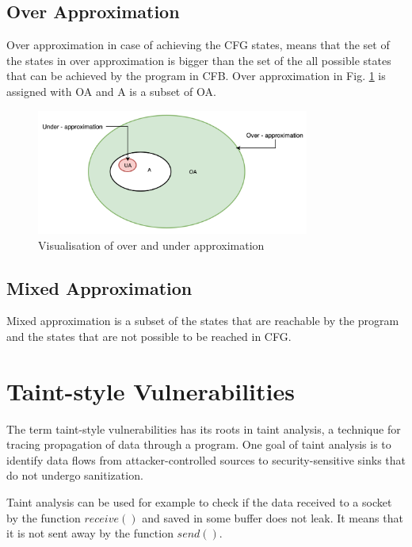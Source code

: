 \documentclass[a4paper, 12pt, journal, onecolumn]{IEEEtran}
\begin{document}
\subsection{Over Approximation}

Over approximation in case of achieving the CFG states, means that the set of the states in over approximation is bigger than the set of the all possible states that can be achieved by the program in CFB. Over approximation in Fig. \ref{fig:approximation} is assigned with OA and A is a subset of OA. \cite{a4}

\begin{figure}[ht]
    \centering
    \captionsetup{justification=centering}
    \includegraphics[width=0.8\textwidth]{approximation.png}
    \caption{Visualisation of over and under approximation \cite{a3} }
    \label{fig:approximation}
\end{figure}

\subsection{Mixed Approximation}

Mixed approximation is a subset of the states that are reachable by the program and the states that are not possible to be reached in CFG.   

\section{Taint-style Vulnerabilities}

The term taint-style vulnerabilities has its roots in taint analysis, a technique for tracing  propagation of data through a program. One goal of taint analysis is to identify data flows from attacker-controlled sources to security-sensitive sinks that do not undergo sanitization.\cite{a5} \cite{a6}

Taint analysis can be used for example to check if the data received to a socket by the function $receive()$ and saved in some buffer does not leak. It means that it is not sent away by the function $send()$.
\end{document}
